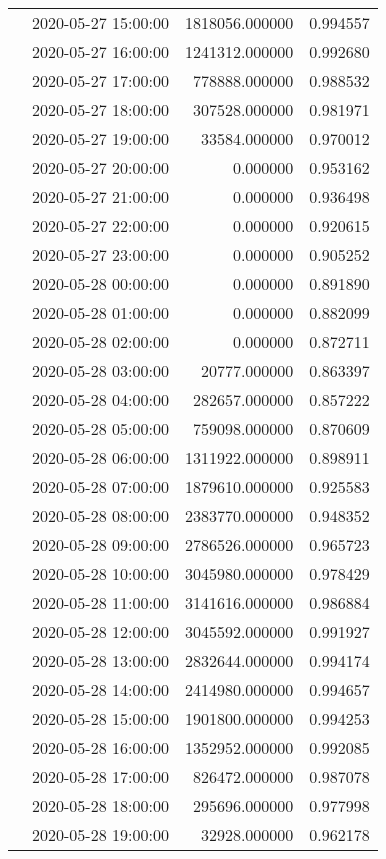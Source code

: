 \begin{tabular}{llrr}
 & 2020-05-27 15:00:00 & 1818056.000000 & 0.994557 \\
 & 2020-05-27 16:00:00 & 1241312.000000 & 0.992680 \\
 & 2020-05-27 17:00:00 & 778888.000000 & 0.988532 \\
 & 2020-05-27 18:00:00 & 307528.000000 & 0.981971 \\
 & 2020-05-27 19:00:00 & 33584.000000 & 0.970012 \\
 & 2020-05-27 20:00:00 & 0.000000 & 0.953162 \\
 & 2020-05-27 21:00:00 & 0.000000 & 0.936498 \\
 & 2020-05-27 22:00:00 & 0.000000 & 0.920615 \\
 & 2020-05-27 23:00:00 & 0.000000 & 0.905252 \\
 & 2020-05-28 00:00:00 & 0.000000 & 0.891890 \\
 & 2020-05-28 01:00:00 & 0.000000 & 0.882099 \\
 & 2020-05-28 02:00:00 & 0.000000 & 0.872711 \\
 & 2020-05-28 03:00:00 & 20777.000000 & 0.863397 \\
 & 2020-05-28 04:00:00 & 282657.000000 & 0.857222 \\
 & 2020-05-28 05:00:00 & 759098.000000 & 0.870609 \\
 & 2020-05-28 06:00:00 & 1311922.000000 & 0.898911 \\
 & 2020-05-28 07:00:00 & 1879610.000000 & 0.925583 \\
 & 2020-05-28 08:00:00 & 2383770.000000 & 0.948352 \\
 & 2020-05-28 09:00:00 & 2786526.000000 & 0.965723 \\
 & 2020-05-28 10:00:00 & 3045980.000000 & 0.978429 \\
 & 2020-05-28 11:00:00 & 3141616.000000 & 0.986884 \\
 & 2020-05-28 12:00:00 & 3045592.000000 & 0.991927 \\
 & 2020-05-28 13:00:00 & 2832644.000000 & 0.994174 \\
 & 2020-05-28 14:00:00 & 2414980.000000 & 0.994657 \\
 & 2020-05-28 15:00:00 & 1901800.000000 & 0.994253 \\
 & 2020-05-28 16:00:00 & 1352952.000000 & 0.992085 \\
 & 2020-05-28 17:00:00 & 826472.000000 & 0.987078 \\
 & 2020-05-28 18:00:00 & 295696.000000 & 0.977998 \\
 & 2020-05-28 19:00:00 & 32928.000000 & 0.962178 \\

\end{tabular}
